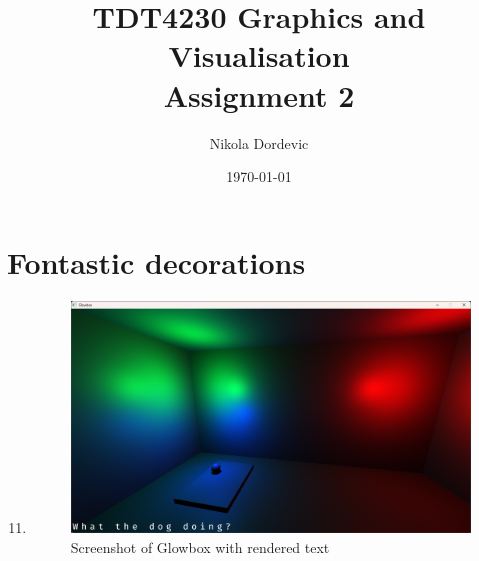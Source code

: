 \documentclass[11pt,a4paper]{report}
\title{TDT4230 Graphics and Visualisation \\ Assignment 2}
\author{Nikola Dordevic}
\date{\today}
\begin{document}
\maketitle
\section{Fontastic decorations}
\begin{enumerate}[label=(\alph*)]\setcounter{enumi}{10}
	\item \hfill
	
	\begin{figure}[h]
		\centering
		\includegraphics[width=\textwidth]{images/task1k.png}
		\caption{Screenshot of Glowbox with rendered text}
	\end{figure}
\end{enumerate}

\clearpage
\end{document}
